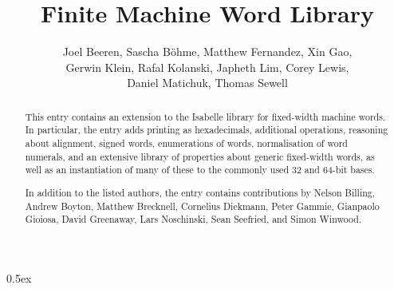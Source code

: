 \documentclass[11pt,a4paper]{article}
\begin{document}
\title{Finite Machine Word Library}
\author{Joel Beeren, Sascha Böhme, Matthew Fernandez, Xin Gao,\\
  Gerwin Klein, Rafal Kolanski, Japheth Lim, Corey Lewis,\\
  Daniel Matichuk, Thomas Sewell}
\maketitle

\begin{abstract}
  This entry contains an extension to the Isabelle library for fixed-width
  machine words. In particular, the entry adds
  printing as hexadecimals, additional operations, reasoning about alignment,
  signed words, enumerations of words, normalisation of word numerals, and an
  extensive library of properties about generic fixed-width words, as well as
  an instantiation of many of these to the commonly used 32 and 64-bit bases.

  In addition to the listed authors, the entry contains contributions by
  Nelson Billing, Andrew Boyton, Matthew Brecknell, Cornelius Diekmann, Peter
  Gammie, Gianpaolo Gioiosa, David Greenaway, Lars Noschinski, Sean Seefried,
  and Simon Winwood.
\end{abstract}

\tableofcontents

\parindent 0pt\parskip 0.5ex





\end{document}
